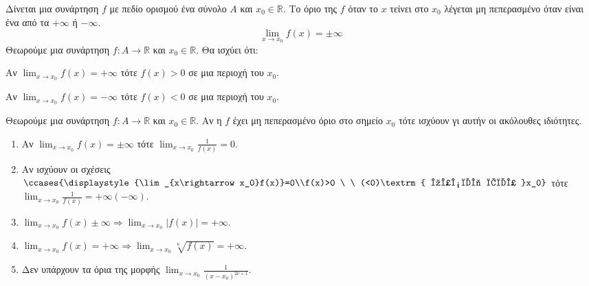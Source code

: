 \documentclass[twoside,nofonts,ektypwsh,math,spyros]{frontisthrio}
\begin{document}
\orismoi
{}
Δίνεται μια συνάρτηση $ f $ με πεδίο ορισμού ένα σύνολο $ A $ και $ x_0\in\mathbb{R} $. Το όριο της $ f $ όταν το $ x $ τείνει στο $ x_0 $ λέγεται μη πεπερασμένο όταν είναι ένα από τα $ +\infty $ ή $ -\infty $.
\[ \lim_{x\to x_0}{f(x)}=\pm\infty \]
\thewrhmata
{}
Θεωρούμε μια συνάρτηση $ f:A\to\mathbb{R} $ και $ x_0\in\mathbb{R} $. Θα ισχύει ότι:
\begin{rlist}
\item Αν $ \lim_{x\to x_0}{f(x)}=+\infty $ τότε $ f(x)>0 $ σε μια περιοχή του $ x_0 $.
\item Αν $ \lim_{x\to x_0}{f(x)}=-\infty $ τότε $ f(x)<0 $ σε μια περιοχή του $ x_0 $.
\end{rlist}
Θεωρούμε μια συνάρτηση $ f:A\to\mathbb{R} $ και $ x_0\in\mathbb{R} $. Αν η $ f $ έχει μη πεπερασμένο όριο στο σημείο $ x_0 $ τότε ισχύουν γι αυτήν οι ακόλουθες ιδιότητες.
\begin{enumerate}[itemsep=0mm,label=\roman*.]
\item Αν $ \displaystyle{\lim_{x\rightarrow x_0}f(x)}=\pm\infty$ τότε $ \displaystyle{\lim_{x\rightarrow x_0}\frac{1}{f(x)}=0} $.
\item Αν ισχύουν οι σχέσεις $ \ccases{\displaystyle{\lim_{x\rightarrow x_0}f(x)}=0\\f(x)>0 \ \ (<0)\textrm{ κοντά στο }x_0}$ τότε $ \displaystyle{\lim_{x\rightarrow x_0}\frac{1}{f(x)}=+\infty(-\infty)} $.
\item $ \displaystyle{\lim_{x\rightarrow x_0}f(x)\pm\infty}\Rightarrow\displaystyle{\lim_{x\rightarrow x_0}|f(x)|}=+\infty $.
\item $ \displaystyle{\lim_{x\rightarrow x_0}f(x)}=+\infty\Rightarrow\displaystyle{\lim_{x\rightarrow x_0}\!\sqrt[\kappa]{f(x)}=+\infty} $.
\item Δεν υπάρχουν τα όρια της μορφής $ \displaystyle{\lim_{x\rightarrow x_0}\frac{1}{(x-x_0)^{2\nu+1}}} $.
\end{enumerate}
\end{document}
